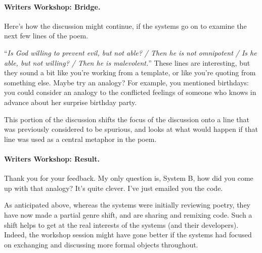 \paragraph{Writers Workshop: Bridge.}

Here's how the discussion might continue, if the systems go on to
examine the next few lines of the poem.
\begin{center}
\begin{minipage}{.9\textwidth}
\begin{dialogue}
 ``\emph{Is God willing to prevent evil, but not able? / Then he is not omnipotent / Is he able, but not willing? / Then he is malevolent.}''
%
 These lines are interesting, but
they sound a bit like you're working from a
template, or like you're quoting from something
else.
%
 Maybe try an analogy?  For example, you mentioned
birthdays: you could consider an analogy to the conflicted feelings of
someone who knows in advance about her surprise birthday party.
\end{dialogue}
\end{minipage}
\end{center}

This portion of the discussion shifts the focus
of the discussion onto a line that was previously
considered to be spurious, and looks at what
would happen if that line was used as a central
metaphor in the poem.

\paragraph{Writers Workshop: Result.} 

\begin{center}
\begin{minipage}{.9\textwidth}
\begin{dialogue}
 Thank you for your feedback.  My only question is, System
B, how did you come up with that analogy?  It's quite clever.
%
 I've just emailed you the code.
\end{dialogue}
\end{minipage}
\end{center}

As anticipated above, whereas the systems were initially reviewing
poetry, they have now made a partial genre shift, and are sharing and
remixing code.  Such a shift helps to get at the real interests of the
systems (and their developers).  Indeed, the workshop session might
have gone better if the systems had focused on exchanging and
discussing more formal objects throughout.
